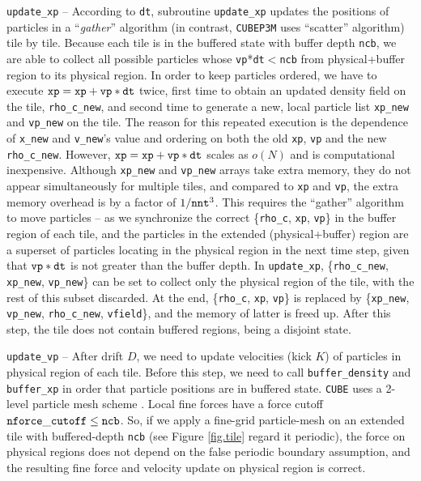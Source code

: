 \documentclass[10pt,twocolumn,preprint]{emulateapj}
\begin{document}
{\tt update\_xp} --
According to {\tt dt}, subroutine {\tt update\_xp} updates the positions of particles in a ``{\it gather}'' algorithm (in contrast, {\tt CUBEP3M} uses ``scatter'' algorithm) tile by tile. Because each tile is in the buffered state with buffer depth {\tt ncb}, we are able to collect all possible particles whose {\tt vp}*{\tt dt}$<${\tt ncb} from physical+buffer region to its physical region. In order to keep particles ordered, we have to execute ${\tt xp}={\tt xp}+{\tt vp}*{\tt dt}$ twice, first time to obtain an updated density field on the tile, {\tt rho\_c\_new}, and second time to generate a new, local particle list {\tt xp\_new} and {\tt vp\_new} on the tile. The reason for this repeated execution is the dependence of {\tt x\_new} and {\tt v\_new}'s value and ordering on both the old {\tt xp}, {\tt vp} and the new {\tt rho\_c\_new}. However, ${\tt xp}={\tt xp}+{\tt vp}*{\tt dt}$ scales as $o(N)$ and is computational inexpensive. Although {\tt xp\_new} and {\tt vp\_new} arrays take extra memory, they do not appear simultaneously for multiple tiles, and compared to {\tt xp} and {\tt vp}, the extra memory overhead is by a factor of $1/{\tt nnt}^3$. This requires the ``gather'' algorithm to move particles -- as we synchronize the correct \{{\tt rho\_c}, {\tt xp}, {\tt vp}\} in the buffer region of each tile, and the particles in the extended (physical+buffer) region are a superset of particles locating in the physical region in the next time step, given that ${\tt vp}*{\tt dt}$ is not greater than the buffer depth. In {\tt update\_xp}, \{{\tt rho\_c\_new}, {\tt xp\_new}, {\tt vp\_new}\} can be set to collect only the physical region of the tile, with the rest of this subset discarded. At the end, \{{\tt rho\_c}, {\tt xp}, {\tt vp}\} is replaced by \{{\tt xp\_new}, {\tt vp\_new}, {\tt rho\_c\_new}, {\tt vfield}\}, and the memory of latter is freed up. After this step, the tile does not contain buffered regions, being a disjoint state.

{\tt update\_vp} -- 
After drift $D$, we need to update velocities (kick $K$) of particles in physical region of each tile. Before this step, we need to call {\tt buffer\_density} and {\tt buffer\_xp} in order that particle positions are in buffered state. {\tt CUBE} uses a 2-level particle mesh scheme \citep{2013MNRAS.436..540H}. Local fine forces have a force cutoff ${\tt nforce\_cutoff}\leq{\tt ncb}$. So, if we apply a fine-grid particle-mesh on an extended tile with buffered-depth {\tt ncb} (see Figure \ref{fig.tile} regard it periodic), the force on physical regions does not depend on the false periodic boundary assumption, and the resulting fine force and velocity update on physical region is correct.
\end{document}
